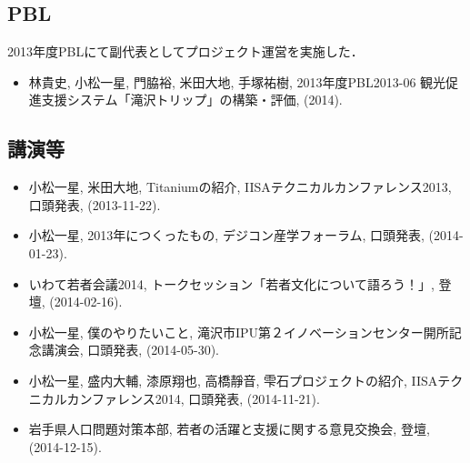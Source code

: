 \documentclass{jsarticle}
\begin{document}
\subsection*{PBL}

2013年度PBLにて副代表としてプロジェクト運営を実施した．

\begin{itemize}
\item 林貴史, 小松一星, 門脇裕, 米田大地, 手塚祐樹, 2013年度PBL2013-06 観光促進支援システム「滝沢トリップ」の構築・評価, (2014).
\end{itemize}

\subsection*{講演等}

\begin{itemize}
\item 小松一星, 米田大地, Titaniumの紹介, IISAテクニカルカンファレンス2013, 口頭発表, (2013-11-22).
\item 小松一星, 2013年につくったもの, デジコン産学フォーラム, 口頭発表, (2014-01-23).
\item いわて若者会議2014, トークセッション「若者文化について語ろう！」, 登壇, (2014-02-16).
\item 小松一星, 僕のやりたいこと, 滝沢市IPU第２イノベーションセンター開所記念講演会, 口頭発表, (2014-05-30).
\item 小松一星, 盛内大輔, 漆原翔也, 高橋靜音, 雫石プロジェクトの紹介, IISAテクニカルカンファレンス2014, 口頭発表, (2014-11-21).
\item 岩手県人口問題対策本部, 若者の活躍と支援に関する意見交換会, 登壇, (2014-12-15).
\end{itemize}
\end{document}
